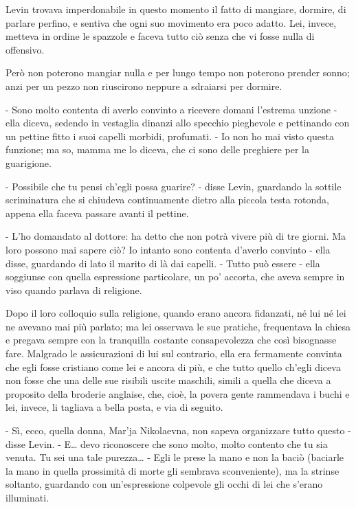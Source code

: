 Levin trovava imperdonabile in questo momento il fatto di mangiare, dormire, di parlare perfino, e sentiva che ogni suo movimento era poco adatto. Lei, invece, metteva in ordine le spazzole e faceva tutto ciò senza che vi fosse nulla di offensivo. 

Però non poterono mangiar nulla e per lungo tempo non poterono prender sonno; anzi per un pezzo non riuscirono neppure a sdraiarsi per dormire. 

- Sono molto contenta di averlo convinto a ricevere domani l'estrema unzione - ella diceva, sedendo in vestaglia dinanzi allo specchio pieghevole e pettinando con un pettine fitto i suoi capelli morbidi, profumati. - Io non ho mai visto questa funzione; ma so, mamma me lo diceva, che ci sono delle preghiere per la guarigione. 

- Possibile che tu pensi ch'egli possa guarire? - disse Levin, guardando la sottile scriminatura che si chiudeva continuamente dietro alla piccola testa rotonda, appena ella faceva passare avanti il pettine. 

- L'ho domandato al dottore: ha detto che non potrà vivere più di tre giorni. Ma loro possono mai sapere ciò? Io intanto sono contenta d'averlo convinto - ella disse, guardando di lato il marito di là dai capelli. - Tutto può essere - ella soggiunse con quella espressione particolare, un po' accorta, che aveva sempre in viso quando parlava di religione. 

Dopo il loro colloquio sulla religione, quando erano ancora fidanzati, né lui né lei ne avevano mai più parlato; ma lei osservava le sue pratiche, frequentava la chiesa e pregava sempre con la tranquilla costante consapevolezza che così bisognasse fare. Malgrado le assicurazioni di lui sul contrario, ella era fermamente convinta che egli fosse cristiano come lei e ancora di più, e che tutto quello ch'egli diceva non fosse che una delle sue risibili uscite maschili, simili a quella che diceva a proposito della broderie anglaise, che, cioè, la povera gente rammendava i buchi e lei, invece, li tagliava a bella posta, e via di seguito. 

- Sì, ecco, quella donna, Mar'ja Nikolaevna, non sapeva organizzare tutto questo - disse Levin. - E\ldots{} devo riconoscere che sono molto, molto contento che tu sia venuta. Tu sei una tale purezza\ldots{} - Egli le prese la mano e non la baciò (baciarle la mano in quella prossimità di morte gli sembrava sconveniente), ma la strinse soltanto, guardando con un'espressione colpevole gli occhi di lei che s'erano illuminati. 

